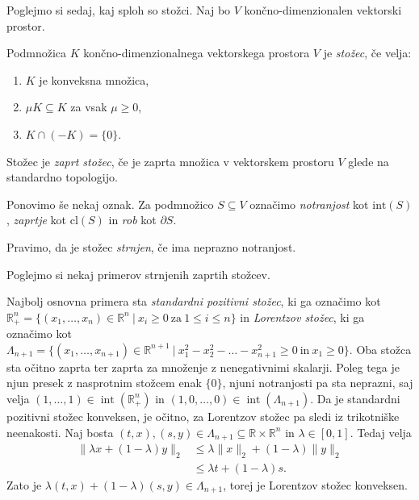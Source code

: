 \documentclass[mat2, tisk]{fmfdelo}
\newcommand{\R}{\mathbb{R}}
\begin{document}
Poglejmo si sedaj, kaj sploh so stožci. Naj bo $V$ končno-dimenzionalen 
vektorski prostor.

\begin{definicija}
  Podmnožica $K$ končno-dimenzionalnega vektorskega prostora $V$ je \emph{stožec},
  če velja:
  \begin{enumerate}
    \item $K$ je konveksna množica,
    \item $\mu K \subseteq K$ za vsak $\mu \geq 0$,
    \item $K \cap (-K) = \{ 0 \}$.
  \end{enumerate}
\end{definicija}

\begin{definicija}
  Stožec je \emph{zaprt stožec}, če je zaprta množica v vektorskem prostoru $V$
  glede na standardno topologijo.
\end{definicija}

Ponovimo še nekaj oznak. Za podmnožico $S \subseteq V$ označimo \emph{notranjost} kot 
$\text{int}(S)$, \emph{zaprtje} kot $\text{cl}(S)$ in \emph{rob} kot $\partial S$.

\begin{definicija}
  Pravimo, da je stožec \emph{strnjen}, če ima neprazno notranjost.
\end{definicija}

Poglejmo si nekaj primerov strnjenih zaprtih stožcev.

\begin{zgled}
  Najbolj osnovna primera sta \emph{standardni pozitivni stožec}, ki ga označimo kot
  $\R_+ ^n = \{ ( x_1, \ldots, x_n ) \in \R^n ~|~ x_i \geq 0 ~\text{za}~ 1 \leq i \leq n \}$ 
  in \emph{Lorentzov stožec}, ki ga označimo kot 
  $\Lambda_{n+1} = \{ ( x_1, \ldots, x_{n+1} ) \in \R^{n+1} ~|~ 
  x_1^2 - x_2^2 - \ldots - x_{n+1}^2 \geq 0 ~\text{in}~ x_1 \geq 0\}$. %
  Oba stožca sta očitno zaprta ter zaprta za množenje
  z nenegativnimi skalarji. Poleg tega je njun presek z
  nasprotnim stožcem enak $\{0\}$, njuni notranjosti pa sta
  neprazni, saj velja
  $(1,\ldots,1)\in\operatorname{int}(\R_+^n)$ in
  $(1,0,\ldots,0)\in\operatorname{int}(\Lambda_{n+1})$. Da je standardni pozitivni stožec konveksen, 
  je očitno, za Lorentzov stožec pa sledi iz trikotniške
  neenakosti. Naj bosta $(t,x),(s,y)\in\Lambda_{n+1}\subseteq\mathbb R\times\mathbb R^n$ 
  in $\lambda\in[0,1]$. Tedaj velja
  \begin{align*}
  \|\lambda x+(1-\lambda)y\|_2
  &\leq \lambda\|x\|_2+(1-\lambda)\|y\|_2\\
  &\leq \lambda t+(1-\lambda)s.
  \end{align*}
  Zato je $\lambda(t,x)+(1-\lambda)(s,y)\in\Lambda_{n+1}$,
  torej je Lorentzov stožec konveksen.
\end{zgled}
\end{document}
